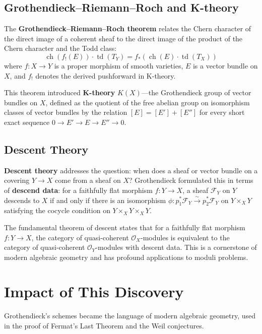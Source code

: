 \subsection*{Grothendieck--Riemann--Roch and K-theory}

The \textbf{Grothendieck--Riemann--Roch theorem} relates the Chern character of
the direct image of a coherent sheaf to the direct image of the product of the
Chern character and the Todd class:
\[
\operatorname{ch}(f_!(E)) \cdot \operatorname{td}(T_Y) = f_*(\operatorname{ch}(E) \cdot \operatorname{td}(T_X))
\]
where $f: X \to Y$ is a proper morphism of smooth varieties, $E$ is a vector
bundle on $X$, and $f_!$ denotes the derived pushforward in K-theory.

This theorem introduced \textbf{K-theory} $K(X)$---the Grothendieck group of
vector bundles on $X$, defined as the quotient of the free abelian group on
isomorphism classes of vector bundles by the relation $[E] = [E'] + [E'']$ for
every short exact sequence $0 \to E' \to E \to E'' \to 0$.

\subsection*{Descent Theory}

\textbf{Descent theory} addresses the question: when does a sheaf or vector
bundle on a covering $Y \to X$ come from a sheaf on $X$? Grothendieck
formulated this in terms of \textbf{descend data}: for a faithfully flat
morphism $f: Y \to X$, a sheaf $\mathcal{F}_Y$ on $Y$ descends to $X$ if and
only if there is an isomorphism $\phi: p_1^*\mathcal{F}_Y \xrightarrow{\sim}
p_2^*\mathcal{F}_Y$ on $Y \times_X Y$ satisfying the cocycle condition on
$Y \times_X Y \times_X Y$.

The fundamental theorem of descent states that for a faithfully flat
morphism $f: Y \to X$, the category of quasi-coherent $\mathcal{O}_X$-modules
is equivalent to the category of quasi-coherent $\mathcal{O}_Y$-modules with
descent data. This is a cornerstone of modern algebraic geometry and has
profound applications to moduli problems.

\section{Impact of This Discovery}

Grothendieck's schemes became the language of modern algebraic geometry, used in
the proof of Fermat's Last Theorem and the Weil conjectures.

